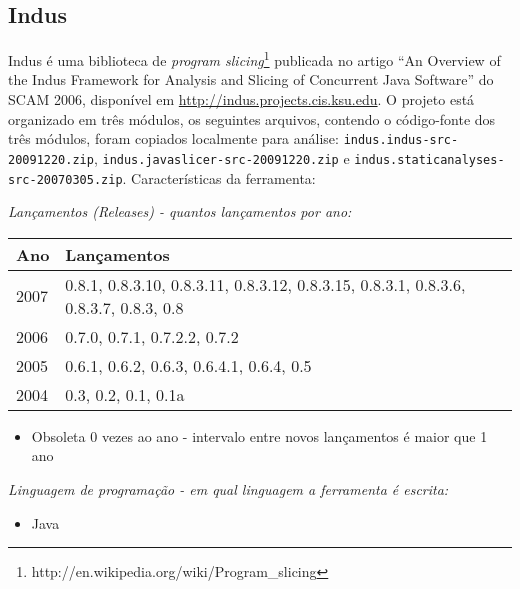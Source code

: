 \subsection{Indus}

Indus é uma biblioteca de {\it program
slicing}\footnote{http://en.wikipedia.org/wiki/Program\_slicing} publicada no
artigo ``An Overview of the Indus Framework for Analysis and Slicing of
Concurrent Java Software'' do SCAM 2006, disponível em
\url{http://indus.projects.cis.ksu.edu}.  O projeto está organizado em três
módulos, os seguintes arquivos, contendo o código-fonte dos três módulos,
foram copiados localmente para análise:
\texttt{indus.indus-src-20091220.zip},
\texttt{indus.javaslicer-src-20091220.zip} e
\texttt{indus.staticanalyses-src-20070305.zip}. Características da ferramenta:

\begin{description}

  \item {\it Lançamentos ({\it Releases}) - quantos lançamentos por ano:}
    \begin{table}[h!]
      \centering
      \begin{tabular}{| l | l |}
        \hline
        Ano  & Lançamentos                              \\
        \hline
        2007 & 0.8.1, 0.8.3.10, 0.8.3.11, 0.8.3.12, 0.8.3.15, 0.8.3.1, 0.8.3.6, 0.8.3.7, 0.8.3, 0.8 \\
        2006 & 0.7.0, 0.7.1, 0.7.2.2, 0.7.2             \\
        2005 & 0.6.1, 0.6.2, 0.6.3, 0.6.4.1, 0.6.4, 0.5 \\
        2004 & 0.3, 0.2, 0.1, 0.1a                      \\
        \hline
      \end{tabular}
    \end{table}
    \begin{itemize}
      \item Obsoleta $0$ vezes ao ano - intervalo entre novos lançamentos é maior que 1 ano
    \end{itemize}

  \item {\it Linguagem de programação - em qual linguagem a ferramenta é escrita:}
    \begin{itemize}
      \item Java
    \end{itemize}

\end{description}

